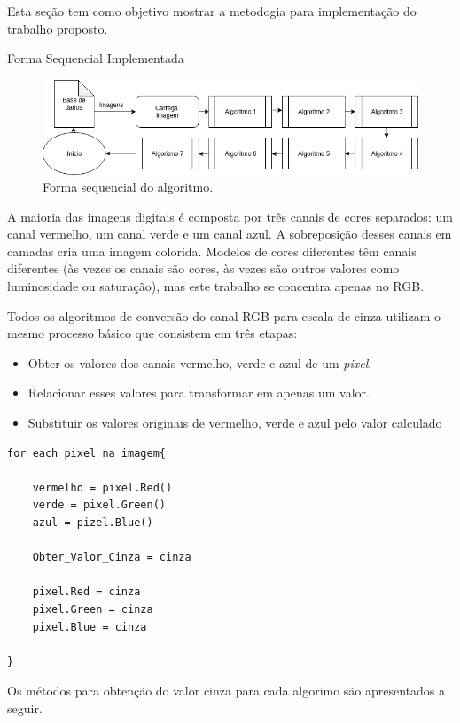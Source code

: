 Esta seção tem como objetivo mostrar a metodogia para implementação do trabalho
proposto.

\begin{subsection}{Forma Sequencial Implementada}


\begin{figure}[!h]
	\centering
	\includegraphics[width=0.95\linewidth]{figs/Sequential.png}
	\caption{Forma sequencial do algoritmo.}
	\label{fig:gray}
\end{figure}



A maioria das imagens digitais é composta por três canais de cores separados: um
canal vermelho, um canal verde e um canal azul. A sobreposição desses canais em
camadas cria uma imagem colorida. Modelos de cores diferentes têm canais
diferentes (às vezes os canais são cores, às vezes são outros valores como
luminosidade ou saturação), mas este trabalho se concentra apenas no RGB.

Todos os algoritmos de conversão do canal RGB para escala de cinza utilizam 
o mesmo processo básico que consistem em três etapas:

\begin{itemize}
\item Obter os valores dos canais vermelho, verde e azul de um \textit{pixel}.
\item Relacionar esses valores para transformar em apenas um valor.
\item Substituir os valores originais de vermelho, verde e azul pelo valor calculado
\end{itemize}


\begin{lstlisting}
for each pixel na imagem{

	vermelho = pixel.Red()
	verde = pixel.Green()
	azul = pizel.Blue()

	Obter_Valor_Cinza = cinza

	pixel.Red = cinza
	pixel.Green = cinza
	pixel.Blue = cinza

}
\end{lstlisting}

Os métodos para obtenção do valor cinza para cada algorimo são apresentados a
seguir.



\end{subsection}
